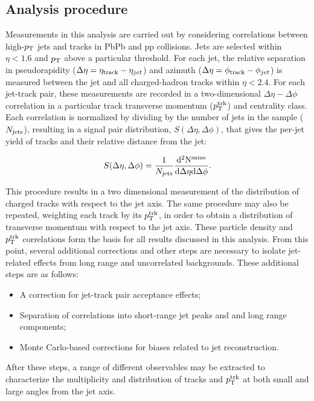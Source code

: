 
\subsection{Analysis procedure}

Measurements in this analysis are carried out by considering correlations between high-$p_{\rm T}$ jets and tracks in PbPb and pp collisions.  Jets are selected within $\eta < 1.6$ and $p_{\rm T}$ above a particular threshold.  For each jet, the relative separation in pseudorapidity ($\Delta\eta = \eta_{\rm track} - \eta_{jet}$) and azimuth ($\Delta\eta = \phi_{\rm track} - \phi_{jet}$) is measured between the jet and all charged-hadron tracks within $\eta < 2.4$.  For each jet-track pair, these measurements are recorded in a two-dimensional $\Delta\eta - \Delta\phi$ correlation in a particular track transverse momentum ($p_{\rm T}^{\rm trk}$) and centrality class.  Each correlation is normalized by dividing by the number of jets in the sample ($N_{\rm jets}$), resulting in a signal pair distribution, $S(\Delta\eta,\Delta\phi)$, that gives the per-jet yield of tracks and their relative distance from the jet:

  \begin{equation}
  \label{eq:signal}
  S(\Delta\eta,\Delta\phi) = \frac{1}{N_{\rm jets}}\frac{\rm d^{2} N^{\rm same}}{\rm d\Delta\eta d\Delta\phi}.
  \end{equation}

This procedure results in a two dimensional measurement of the distribution of charged tracks with respect to the jet axis.  The same procedure may also be repeated, weighting each track by its $p_{\rm T}^{\rm trk}$, in order to obtain a distribution of transverse momentum with respect to the jet axis.  These particle density and $p_{\rm T}^{\rm trk}$ correlations form the basis for all results discussed in this analysis.  From this point, several additional corrections and other steps are necessary to isolate jet-related effects from long range and uncorrelated backgrounds.  These additional steps are as follows: 
\begin{itemize}
\item A correction for jet-track pair acceptance effects;
\item Separation of correlations into short-range jet peaks and and long range components;
\item Monte Carlo-based corrections for biases related to jet reconstruction.
\end{itemize}
After these steps, a range of different observables may be extracted to characterize the multiplicity and distribution of tracks and $p_{\rm T}^{\rm trk}$ at both small and large angles from the jet axis.  

